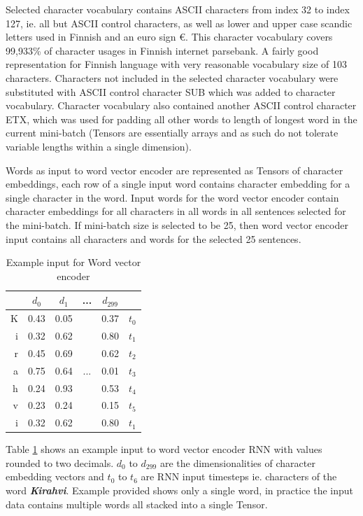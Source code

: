 \documentclass[12pt,a4paper,english
]{tutthesis}
\begin{document}
Selected character vocabulary contains ASCII characters from index 32 to index 127, ie. all but ASCII control characters, as well as lower and upper case scandic letters used in Finnish and an euro sign €. This character vocabulary covers 99,933\% of character usages in Finnish internet parsebank. A fairly good representation for Finnish language with very reasonable vocabulary size of 103 characters. Characters not included in the selected character vocabulary were substituted with ASCII control character SUB which was added to character vocabulary. Character vocabulary also contained another ASCII control character ETX, which was used for padding all other words to length of longest word in the current mini-batch (Tensors are essentially arrays and as such do not tolerate variable lengths within a single dimension).

Words as input to word vector encoder are represented as Tensors of character embeddings, each row of a single input word contains character embedding for a single character in the word. Input words for the word vector encoder contain character embeddings for all characters in all words in all sentences selected for the mini-batch. If mini-batch size is selected to be 25, then word vector encoder input contains all characters and words for the selected 25 sentences.

\begin{table}[htbp]
\caption{Example input for Word vector encoder}
\label{table:word_vector_encoder_input}
\centering
\begin{tabular}{|r|c|c|c|c|l|}
  \hline
  & $d_0$ & $d_1$ & ... & $d_{299}$ & \\
  \hline
  \hline
  K & 0.43 & 0.05 & & 0.37 & $t_0$ \\
  i & 0.32 & 0.62 & & 0.80 & $t_1$ \\
  r & 0.45 & 0.69 & & 0.62 & $t_2$ \\
  a & 0.75 & 0.64 & ... & 0.01 & $t_3$ \\
  h & 0.24 & 0.93 & & 0.53 & $t_4$ \\
  v & 0.23 & 0.24 & & 0.15 & $t_5$ \\
  i & 0.32 & 0.62 & & 0.80 & $t_1$ \\
  \hline
\end{tabular}
\end{table}
Table \ref{table:word_vector_encoder_input} shows an example input to word vector encoder RNN with values rounded to two decimals. $d_0$ to $d_{299}$ are the dimensionalities of character embedding vectors and $t_0$ to $t_6$ are RNN input timesteps ie. characters of the word \textbf{\textit{Kirahvi}}. Example provided shows only a single word, in practice the input data contains multiple words all stacked into a single Tensor.
\end{document}
